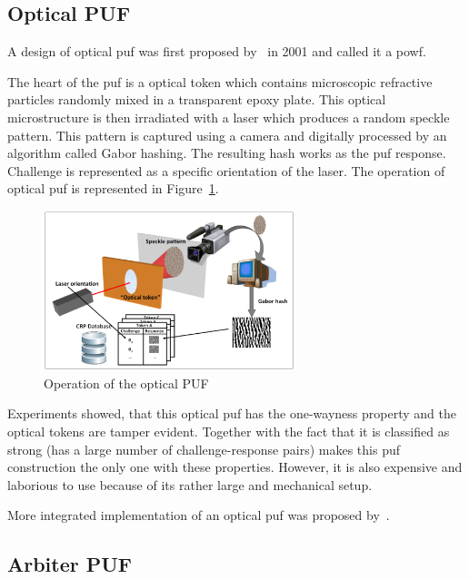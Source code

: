 \subsection{Optical PUF}\label{sec:optical_puf}

A design of optical \gls{puf} was first proposed by~\cite{Pappu2001} in 2001 and called it a \glsdesc{powf}.

The heart of the \gls{puf} is a optical token which contains microscopic refractive particles randomly mixed in a transparent epoxy plate. This optical microstructure is then irradiated with a laser which produces a random speckle pattern. This pattern is captured using a camera and digitally processed by an algorithm called Gabor hashing. The resulting hash works as the \gls{puf} response. Challenge is represented as a specific orientation of the laser. The operation of optical \gls{puf} is represented in Figure~\ref{fig:optical_puf}.

\begin{figure}[h!]
    \centering
    \captionsetup{justification=centering,margin=0.5cm}
    \includegraphics[width=0.65\textwidth]{images/optical_puf.png}
    \caption[Operation of the optical PUF]{Operation of the optical PUF}
    \label{fig:optical_puf}
\end{figure}

Experiments showed, that this optical \gls{puf} has the one-wayness property and the optical tokens are tamper evident.\cite{Pappu2002} Together with the fact that it is classified as strong (has a large number of challenge-response pairs) makes this \gls{puf} construction the only one with these properties. However, it is also expensive and laborious to use because of its rather large and mechanical setup.\cite{Maes2012}

More integrated implementation of an optical \gls{puf} was proposed by~\cite{Rhrmair2013}.

\subsection{Arbiter PUF}

